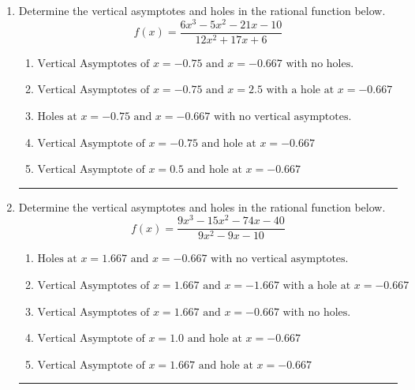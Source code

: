 \documentclass[14pt]{extbook}
\newcommand{\litem}[1]{\item#1\hspace*{-1cm}\rule{\textwidth}{0.4pt}}
\begin{document}
\begin{enumerate}
{\begin{enumerate}[label=\Alph*.]
\end{enumerate} }
\litem{
Determine the vertical asymptotes and holes in the rational function below.\[ f(x) = \frac{6x^{3} -5 x^{2} -21 x -10}{12x^{2} +17 x + 6} \]\begin{enumerate}[label=\Alph*.]
\item \( \text{Vertical Asymptotes of } x = -0.75 \text{ and } x = -0.667 \text{ with no holes.} \)
\item \( \text{Vertical Asymptotes of } x = -0.75 \text{ and } x = 2.5 \text{ with a hole at } x = -0.667 \)
\item \( \text{Holes at } x = -0.75 \text{ and } x = -0.667 \text{ with no vertical asymptotes.} \)
\item \( \text{Vertical Asymptote of } x = -0.75 \text{ and hole at } x = -0.667 \)
\item \( \text{Vertical Asymptote of } x = 0.5 \text{ and hole at } x = -0.667 \)

\end{enumerate} }
\litem{
Determine the vertical asymptotes and holes in the rational function below.\[ f(x) = \frac{9x^{3} -15 x^{2} -74 x -40}{9x^{2} -9 x -10} \]\begin{enumerate}[label=\Alph*.]
\item \( \text{Holes at } x = 1.667 \text{ and } x = -0.667 \text{ with no vertical asymptotes.} \)
\item \( \text{Vertical Asymptotes of } x = 1.667 \text{ and } x = -1.667 \text{ with a hole at } x = -0.667 \)
\item \( \text{Vertical Asymptotes of } x = 1.667 \text{ and } x = -0.667 \text{ with no holes.} \)
\item \( \text{Vertical Asymptote of } x = 1.0 \text{ and hole at } x = -0.667 \)
\item \( \text{Vertical Asymptote of } x = 1.667 \text{ and hole at } x = -0.667 \)


\end{enumerate}}
\end{enumerate}
\end{document}
